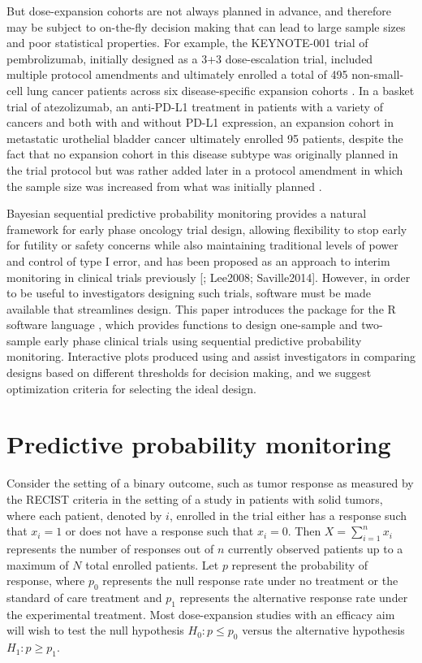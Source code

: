 But dose-expansion cohorts are not always planned in advance, and
therefore may be subject to on-the-fly decision making that can lead to
large sample sizes and poor statistical properties. For example, the
KEYNOTE-001 trial of pembrolizumab, initially designed as a 3+3
dose-escalation trial, included multiple protocol amendments and
ultimately enrolled a total of 495 non-small-cell lung cancer patients
across six disease-specific expansion cohorts \citep{Garon2015}. In a
basket trial of atezolizumab, an anti-PD-L1 treatment in patients with a
variety of cancers and both with and without PD-L1 expression, an
expansion cohort in metastatic urothelial bladder cancer ultimately
enrolled 95 patients, despite the fact that no expansion cohort in this
disease subtype was originally planned in the trial protocol but was
rather added later in a protocol amendment in which the sample size was
increased from what was initially planned
\citep{Petrylak2018, Powles2014}.

Bayesian sequential predictive probability monitoring provides a natural
framework for early phase oncology trial design, allowing flexibility to
stop early for futility or safety concerns while also maintaining
traditional levels of power and control of type I error, and has been
proposed as an approach to interim monitoring in clinical trials
previously {[}\citet{Dmitrienko2006}; Lee2008; Saville2014{]}. However,
in order to be useful to investigators designing such trials, software
must be made available that streamlines design. This paper introduces
the  package for the R software language \citep{RCT2020},
which provides functions to design one-sample and two-sample early phase
clinical trials using sequential predictive probability monitoring.
Interactive plots produced using  and 
assist investigators in comparing designs based on different thresholds
for decision making, and we suggest optimization criteria for selecting
the ideal design.

\hypertarget{predictive-probability-monitoring}{%
\section{Predictive probability
monitoring}\label{predictive-probability-monitoring}}

Consider the setting of a binary outcome, such as tumor response as
measured by the RECIST criteria in the setting of a study in patients
with solid tumors, where each patient, denoted by \(i\), enrolled in the
trial either has a response such that \(x_i = 1\) or does not have a
response such that \(x_i = 0\). Then \(X = \sum_{i=1}^n x_i\) represents
the number of responses out of \(n\) currently observed patients up to a
maximum of \(N\) total enrolled patients. Let \(p\) represent the
probability of response, where \(p_0\) represents the null response rate
under no treatment or the standard of care treatment and \(p_1\)
represents the alternative response rate under the experimental
treatment. Most dose-expansion studies with an efficacy aim will wish to
test the null hypothesis \(H_0: p \leq p_0\) versus the alternative
hypothesis \(H_1: p \geq p_1\).

